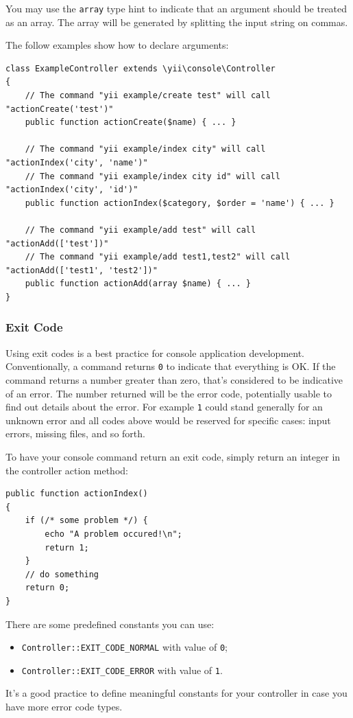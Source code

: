 You may use the \lstinline|array| type hint to indicate that an argument should be treated as an array. The array will be generated
by splitting the input string on commas.

The follow examples show how to declare arguments:

\lstset{language=php}\begin{lstlisting}
class ExampleController extends \yii\console\Controller
{
    // The command "yii example/create test" will call "actionCreate('test')"
    public function actionCreate($name) { ... }

    // The command "yii example/index city" will call "actionIndex('city', 'name')"
    // The command "yii example/index city id" will call "actionIndex('city', 'id')"
    public function actionIndex($category, $order = 'name') { ... }

    // The command "yii example/add test" will call "actionAdd(['test'])"
    // The command "yii example/add test1,test2" will call "actionAdd(['test1', 'test2'])"
    public function actionAdd(array $name) { ... }
}
\end{lstlisting}
\subsubsection{Exit Code}
Using exit codes is a best practice for console application development. Conventionally, a command returns \lstinline|0| to indicate that
everything is OK. If the command returns a number greater than zero, that's considered to be indicative of an error. The number returned will be the error
code, potentially usable to find out details about the error.
For example \lstinline|1| could stand generally for an unknown error and all codes above would be reserved for specific cases: input errors, missing files, and so forth.

To have your console command return an exit code, simply return an integer in the controller action
method:

\lstset{language=php}\begin{lstlisting}
public function actionIndex()
{
    if (/* some problem */) {
        echo "A problem occured!\n";
        return 1;
    }
    // do something
    return 0;
}
\end{lstlisting}
There are some predefined constants you can use:

\begin{itemize}
\item \lstinline|Controller::EXIT_CODE_NORMAL| with value of \lstinline|0|;
\item \lstinline|Controller::EXIT_CODE_ERROR| with value of \lstinline|1|.
\end{itemize}
It's a good practice to define meaningful constants for your controller in case you have more error code types.

